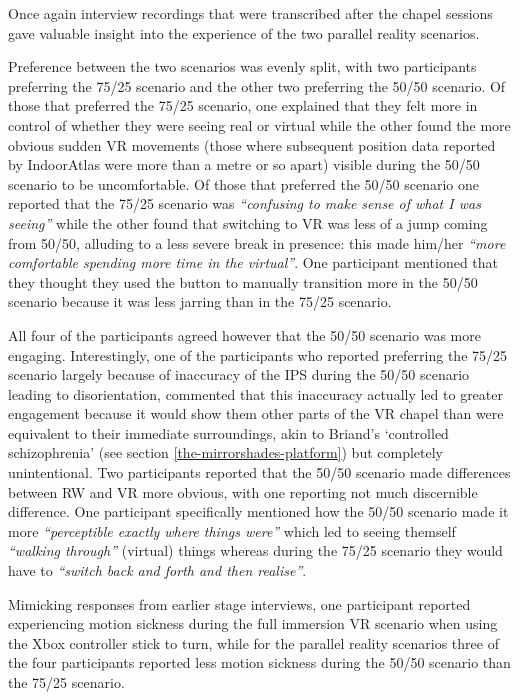 Once again interview recordings that were transcribed after the chapel sessions gave valuable insight into the experience of the two parallel reality scenarios.

Preference between the two scenarios was evenly split, with two participants preferring the 75/25 scenario and the other two preferring the 50/50 scenario. Of those that preferred the 75/25 scenario, one explained that they felt more in control of whether they were seeing real or virtual while the other found the more obvious sudden VR movements (those where subsequent position data reported by IndoorAtlas were more than a metre or so apart) visible during the 50/50 scenario to be uncomfortable. Of those that preferred the 50/50 scenario one reported that the 75/25 scenario was \textit{``confusing to make sense of what I was seeing''} while the other found that switching to VR was less of a jump coming from 50/50, alluding to a less severe break in presence: this made him/her \textit{``more comfortable spending more time in the virtual''}. One participant mentioned that they thought they used the button to manually transition more in the 50/50 scenario because it was less jarring than in the 75/25 scenario.

All four of the participants agreed however that the 50/50 scenario was more engaging. Interestingly, one of the participants who reported preferring the 75/25 scenario largely because of inaccuracy of the IPS during the 50/50 scenario leading to disorientation, commented that this inaccuracy actually led to greater engagement because it would show them other parts of the VR chapel than were equivalent to their immediate surroundings, akin to Briand's `controlled schizophrenia' (see section \ref{the-mirrorshades-platform}) but completely unintentional. Two participants reported that the 50/50 scenario made differences between RW and VR more obvious, with one reporting not much discernible difference. One participant specifically mentioned how the 50/50 scenario made it more \textit{``perceptible exactly where things were''} which led to seeing themself \textit{``walking through''} (virtual) things whereas during the 75/25 scenario they would have to \textit{``switch back and forth and then realise''}.

Mimicking responses from earlier stage interviews, one participant reported experiencing motion sickness during the full immersion VR scenario when using the Xbox controller stick to turn, while for the parallel reality scenarios three of the four participants reported less motion sickness during the 50/50 scenario than the 75/25 scenario.

